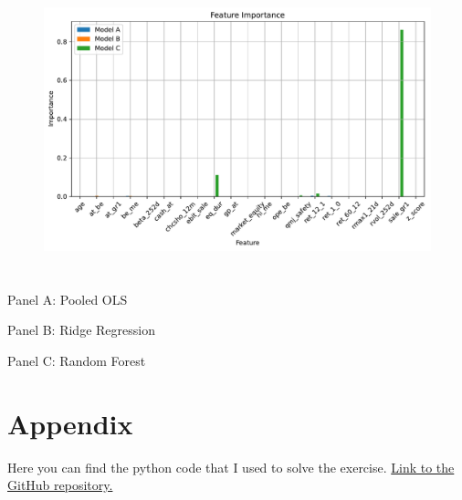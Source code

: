 \documentclass[hidelinks,12pt]{article}
\begin{document}
\subsection{}
\begin{table}[htbp]
    \centering
    \caption{}
    \resizebox{!}{!}{}
\end{table}

\FloatBarrier
\section{}

\begin{figure}[htbp]
    \centering
    \includegraphics[width=.75\textwidth]{out/6_4.pdf}
\end{figure}
\FloatBarrier
\section{}
\subsection{}
\begin{table}[htbp]
    \centering
    \caption{}
    \resizebox{!}{!}{}
\end{table}
\FloatBarrier
\subsection{}
\begin{table}[htbp]
    \centering
    \caption{}
    \caption*{\scriptsize\textmd{Panel A: Pooled OLS}}
    \resizebox{0.65\textwidth}{!}{}
    
    \vspace{0.5cm} %
    
    \caption*{\scriptsize\textmd{Panel B: Ridge Regression}}
    \resizebox{0.65\textwidth}{!}{}
    
    \vspace{0.5cm} %
    
    \caption*{\scriptsize\textmd{Panel C: Random Forest}}
    \resizebox{0.65\textwidth}{!}{}
\end{table}
\FloatBarrier


\FloatBarrier
\appendix

\section*{Appendix}

Here you can find the python code that I used to solve the exercise. \href{https://github.com/mortezaaghajanzadeh/BDAP/tree/main/Assignments/Assignment 4}{Link to the GitHub repository.}
\end{document}
